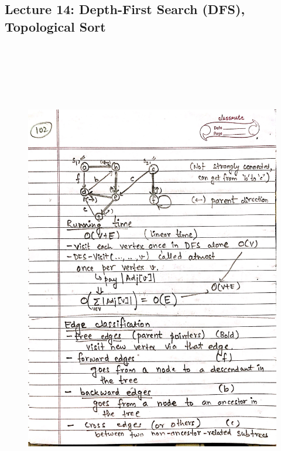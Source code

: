 \newpage
{\color{black} \subsection*{Lecture 14: Depth-First Search (DFS), Topological Sort}}
\begin{figure}[H]
    \centering
    \includegraphics[width=16cm, height=21cm]{"./MIT-6.006/MIT-6006-102"}
\end{figure}

